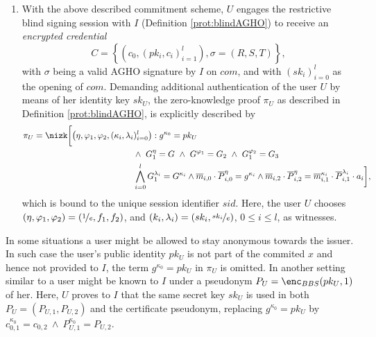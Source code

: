 \documentclass[runningheads]{llncs}
\begin{document}
\begin{definition}
\begin{enumerate}
\item
With the above described commitment scheme, $U$ engages the restrictive blind signing session with $I$ (Definition \ref{prot:blindAGHO}) to receive an \emph{encrypted credential} 
\begin{equation*}
\label{e:credential}
C= \left\{\left(c_0,  \left(pk_i, c_i\right)_{i=1}^l\right), \sigma = (R,S,T)\right\},
\end{equation*}
with $\sigma$ being a valid AGHO signature by $I$ on $com$, and with $(sk_i)_{i=0}^l$ as the opening of $com$.
Demanding additional authentication of the user $U$ by means of her identity key $sk_U$, 
 the zero-knowledge proof $\pi_U$ as described in Definition \ref{prot:blindAGHO}, is explicitly described by
\begin{align*}
\pi_U = \nizk\bigg[\big(\eta, \varphi_1, \varphi_2, (\kappa_i,\lambda_i&)_{i=0}^l\big) :
g^{\kappa_0}=pk_U  
\\
&\wedge~ G_1^\eta = G  ~\wedge~  G^{\varphi_1}= G_2 ~\wedge~ G_1^{\varphi_2} = G_3
\\&
\bigwedge_{i=0}^l  
G_1^{\lambda_i} = G^{\kappa_i} \wedge
\overline{m}_{i,0}\cdot \overline P_{i,0}^{\eta} = g^{\kappa_i} 
\wedge
 \overline m_{i,2}\cdot \overline P_{i,2}^{\eta}  = \overline m_{i,1}^{\kappa_i} \cdot \overline P_{i,1}^{\lambda_i} \cdot a_i   
\bigg],
\end{align*}
which is bound to the unique session identifier $sid$.
Here, the user $U$ chooses $(\eta, \varphi_1, \varphi_2) = (\nicefrac{1}{e},f_1,f_2)$, and $(k_i,\lambda_i) = (sk_i, \nicefrac{sk_i}{e})$, $0\leq i\leq l$, as witnesses. 
\end{enumerate}
\end{definition}

\begin{remark}
\label{rem:issuance}
In some situations a user might be allowed to stay anonymous towards the issuer.
In such case the user's public identity $pk_U$ is not part of the commited $x$ and hence not provided to $I$, the term $g^{\kappa_0}=pk_U$ in $\pi_{U}$ is omitted.
In another setting similar to \cite{brands99,idemix} a user might be known to $I$ under a pseudonym $P_U=\enc_{BBS}(pk_U, 1)$ of her. 
Here, $U$ proves to $I$ that the same secret key $sk_U$ is used in both $P_U=(P_{U,1},P_{U,2})$ and the certificate pseudonym, replacing $g^{\kappa_0}=pk_U$ by $c_{0,1}^{\kappa_0} = c_{0,2} ~\land ~ P_{U,1}^{\kappa_0} = P_{U,2}$.
\end{remark}
\end{document}
